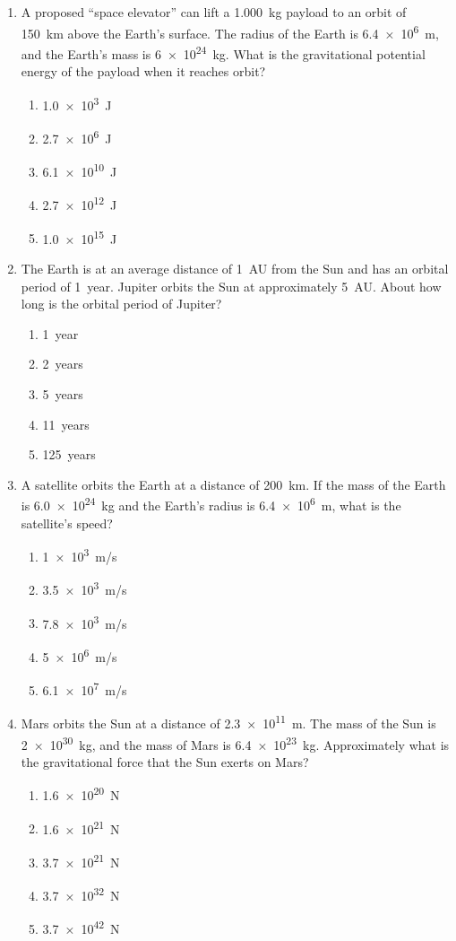 \documentclass[12pt]{article}
\begin{document}
\begin{enumerate}[leftmargin=50pt,label=\underline{\hspace{0.4in}} \arabic*.]
\item A proposed ``space elevator'' can lift a \SI{1,000}{kg} payload to an
  orbit of \SI{150}{km} above the Earth's surface. The radius of the Earth is
  \SI{6.4e6}{m}, and the Earth's mass is \SI{6e24}{kg}. What is the
  gravitational potential energy of the payload when it reaches orbit?
  \begin{enumerate}[noitemsep,topsep=0pt,leftmargin=18pt]
  \item\SI{1.0e3}{J}
  \item\SI{2.7e6}{J}
  \item\SI{6.1e10}{J}
  \item\SI{2.7e12}{J}
  \item\SI{1.0e15}{J}
  \end{enumerate}

\item The Earth is at an average distance of \SI{1}{AU} from the Sun and has an
  orbital period of \SI{1}{year}. Jupiter orbits the Sun at approximately
  \SI{5}{AU}. About how long is the orbital period of Jupiter?
  \begin{enumerate}[noitemsep,topsep=0pt,leftmargin=18pt]
  \item\SI{1}{year}
  \item\SI{2}{years}
  \item\SI{5}{years}
  \item\SI{11}{years}
  \item\SI{125}{years}
  \end{enumerate}
  
\item A satellite orbits the Earth at a distance of \SI{200}{km}. If the mass
  of the Earth is \SI{6.0e24}{kg} and the Earth's radius is \SI{6.4e6}{m}, what
  is the satellite's speed?
  \begin{enumerate}[noitemsep,topsep=0pt,leftmargin=18pt]
  \item\SI{1e3}{m/s}
  \item\SI{3.5e3}{m/s}
  \item\SI{7.8e3}{m/s}
  \item\SI{5e6}{m/s}
  \item\SI{6.1e7}{m/s}
  \end{enumerate}
  
\item Mars orbits the Sun at a distance of \SI{2.3e11}{m}. The mass of the Sun
  is \SI{2e30}{kg}, and the mass of Mars is \SI{6.4e23}{kg}. Approximately
  what is the gravitational force that the Sun exerts on Mars?
  \begin{enumerate}[noitemsep,topsep=0pt,leftmargin=18pt]
  \item\SI{1.6e20}{N}
  \item\SI{1.6e21}{N}
  \item\SI{3.7e21}{N}
  \item\SI{3.7e32}{N}
  \item\SI{3.7e42}{N}
  \end{enumerate}


\end{enumerate}
\end{document}
